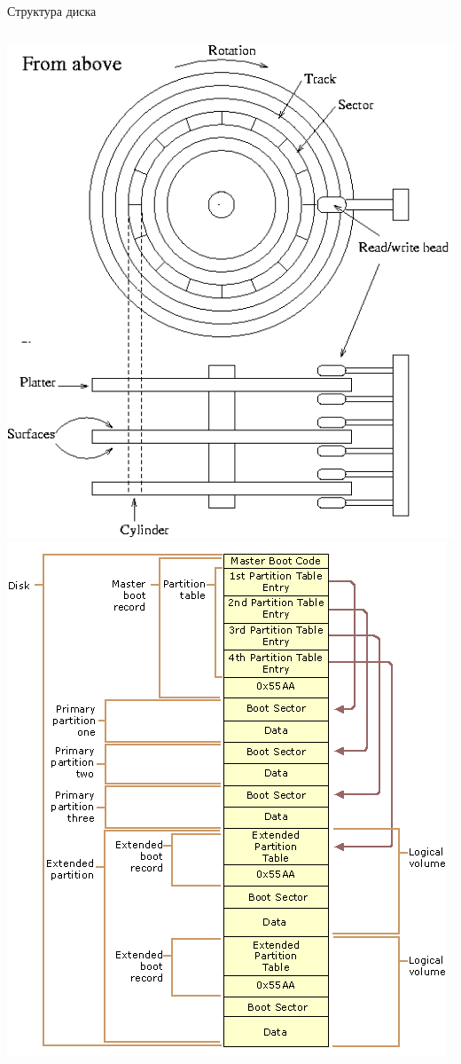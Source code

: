 \documentclass[ignorenonframetext, professionalfonts, hyperref={pdftex, unicode}]{beamer}
\begin{document}
\begin{frame}{Структура диска}
	\begin{columns}
		\includegraphics[height=0.8\textheight]{04-hd-schematic.png}
		\includegraphics[height=0.8\textheight]{04-disk-structure.png}
	\end{columns}
\end{frame}
\end{document}
